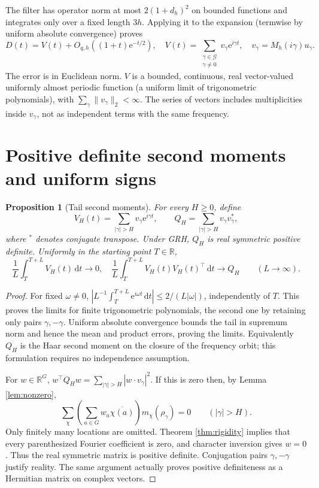 \documentclass[11pt]{article}
\newtheorem{proposition}[theorem]{Proposition}
\newcommand{\R}{\mathbb R}\newcommand{\C}{\mathbb C}\newcommand{\Z}{\mathbb Z}\newcommand{\e}{\mathrm e}\newcommand{\dd}{\,\mathrm d}\newcommand{\id}{\mathrm I}\newcommand{\ord}{\operatorname{ord}}\newcommand{\Rea}{\operatorname{Re}}\newcommand{\conv}{\operatorname{conv}}\newcommand{\norm}[1]{\lVert#1\rVert}\newcommand{\ph}{\varphi(q)}
\begin{document}
The filter has operator norm at most $2(1+d_h)^2$ on bounded functions and integrates only over a fixed length $3h$. Applying it to the expansion (termwise by uniform absolute convergence) proves
\begin{equation}\label{eq:D}
 D(t)=V(t)+O_{q,h}((1+t)\e^{-t/2}),\quad
 V(t)=\sum_{\substack{\gamma\in\mathcal G\\\gamma\ne0}}v_\gamma\e^{i\gamma t},\quad
 v_\gamma=M_h(i\gamma)u_\gamma.
\end{equation}
The error is in Euclidean norm. $V$ is a bounded, continuous, real vector-valued uniformly almost periodic function (a uniform limit of trigonometric polynomials), with $\sum_\gamma\norm{v_\gamma}_2<\infty$. The series of vectors includes multiplicities inside $v_\gamma$, not as independent terms with the same frequency.

\section{Positive definite second moments and uniform signs}
\begin{proposition}[Tail second moments]\label{prop:covariance}
For every $H\ge0$, define
\[
 V_H(t)=\sum_{|\gamma|>H}v_\gamma\e^{i\gamma t},\qquad
 Q_H=\sum_{|\gamma|>H}v_\gamma v_\gamma^*,
\]
where $^*$ denotes conjugate transpose. Under GRH, $Q_H$ is real symmetric positive definite. Uniformly in the starting point $T\in\R$,
\[
 \frac1L\int_T^{T+L}V_H(t)\dd t\longrightarrow0,\quad
 \frac1L\int_T^{T+L}V_H(t)V_H(t)^\top\dd t\longrightarrow Q_H
 \qquad(L\to\infty).
\]
\end{proposition}
\begin{proof}
For fixed $\omega\ne0$, $|L^{-1}\int_T^{T+L}\e^{i\omega t}\dd t|\le2/(L|\omega|)$, independently of $T$. This proves the limits for finite trigonometric polynomials, the second one by retaining only pairs $\gamma,-\gamma$. Uniform absolute convergence bounds the tail in supremum norm and hence the mean and product errors, proving the limits. Equivalently $Q_H$ is the Haar second moment on the closure of the frequency orbit; this formulation requires no independence assumption.

For $w\in\R^G$, $w^\top Q_Hw=\sum_{|\gamma|>H}|w\cdot v_\gamma|^2$. If this is zero then, by Lemma \ref{lem:nonzero},
\[
  \sum_\chi\left(\sum_{a\in G}w_a\overline{\chi(a)}\right)m_\chi(\rho_\gamma)=0
  \qquad(|\gamma|>H).
\]
Only finitely many locations are omitted. Theorem \ref{thm:rigidity} implies that every parenthesized Fourier coefficient is zero, and character inversion gives $w=0$. Thus the real symmetric matrix is positive definite. Conjugation pairs $\gamma,-\gamma$ justify reality. The same argument actually proves positive definiteness as a Hermitian matrix on complex vectors.
\end{proof}
\end{document}
